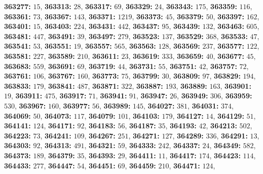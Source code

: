 \textsf{\bfseries 363277:} $15$, \textsf{\bfseries 363313:} $28$, \textsf{\bfseries 363317:} $69$, \textsf{\bfseries 363329:} $24$, \textsf{\bfseries 363343:} $175$, \textsf{\bfseries 363359:} $116$, \textsf{\bfseries 363361:} $73$, \textsf{\bfseries 363367:} $143$, \textsf{\bfseries 363371:} $1219$, \textsf{\bfseries 363373:} $45$, \textsf{\bfseries 363379:} $50$, \textsf{\bfseries 363397:} $162$, \textsf{\bfseries 363401:} $15$, \textsf{\bfseries 363403:} $224$, \textsf{\bfseries 363431:} $442$, \textsf{\bfseries 363437:} $95$, \textsf{\bfseries 363439:} $132$, \textsf{\bfseries 363463:} $605$, \textsf{\bfseries 363481:} $447$, \textsf{\bfseries 363491:} $39$, \textsf{\bfseries 363497:} $279$, \textsf{\bfseries 363523:} $137$, \textsf{\bfseries 363529:} $368$, \textsf{\bfseries 363533:} $47$, \textsf{\bfseries 363541:} $53$, \textsf{\bfseries 363551:} $19$, \textsf{\bfseries 363557:} $565$, \textsf{\bfseries 363563:} $128$, \textsf{\bfseries 363569:} $237$, \textsf{\bfseries 363577:} $122$, \textsf{\bfseries 363581:} $227$, \textsf{\bfseries 363589:} $210$, \textsf{\bfseries 363611:} $23$, \textsf{\bfseries 363619:} $333$, \textsf{\bfseries 363659:} $40$, \textsf{\bfseries 363677:} $45$, \textsf{\bfseries 363683:} $559$, \textsf{\bfseries 363691:} $69$, \textsf{\bfseries 363719:} $44$, \textsf{\bfseries 363731:} $55$, \textsf{\bfseries 363751:} $42$, \textsf{\bfseries 363757:} $72$, \textsf{\bfseries 363761:} $106$, \textsf{\bfseries 363767:} $160$, \textsf{\bfseries 363773:} $75$, \textsf{\bfseries 363799:} $30$, \textsf{\bfseries 363809:} $97$, \textsf{\bfseries 363829:} $194$, \textsf{\bfseries 363833:} $179$, \textsf{\bfseries 363841:} $487$, \textsf{\bfseries 363871:} $322$, \textsf{\bfseries 363887:} $193$, \textsf{\bfseries 363889:} $163$, \textsf{\bfseries 363901:} $19$, \textsf{\bfseries 363911:} $475$, \textsf{\bfseries 363917:} $71$, \textsf{\bfseries 363941:} $91$, \textsf{\bfseries 363947:} $26$, \textsf{\bfseries 363949:} $306$, \textsf{\bfseries 363959:} $530$, \textsf{\bfseries 363967:} $160$, \textsf{\bfseries 363977:} $56$, \textsf{\bfseries 363989:} $145$, \textsf{\bfseries 364027:} $381$, \textsf{\bfseries 364031:} $374$, \textsf{\bfseries 364069:} $50$, \textsf{\bfseries 364073:} $117$, \textsf{\bfseries 364079:} $101$, \textsf{\bfseries 364103:} $179$, \textsf{\bfseries 364127:} $14$, \textsf{\bfseries 364129:} $51$, \textsf{\bfseries 364141:} $124$, \textsf{\bfseries 364171:} $92$, \textsf{\bfseries 364183:} $56$, \textsf{\bfseries 364187:} $35$, \textsf{\bfseries 364193:} $42$, \textsf{\bfseries 364213:} $502$, \textsf{\bfseries 364223:} $73$, \textsf{\bfseries 364241:} $109$, \textsf{\bfseries 364267:} $251$, \textsf{\bfseries 364271:} $127$, \textsf{\bfseries 364289:} $336$, \textsf{\bfseries 364291:} $13$, \textsf{\bfseries 364303:} $92$, \textsf{\bfseries 364313:} $491$, \textsf{\bfseries 364321:} $59$, \textsf{\bfseries 364333:} $242$, \textsf{\bfseries 364337:} $24$, \textsf{\bfseries 364349:} $582$, \textsf{\bfseries 364373:} $189$, \textsf{\bfseries 364379:} $35$, \textsf{\bfseries 364393:} $29$, \textsf{\bfseries 364411:} $11$, \textsf{\bfseries 364417:} $174$, \textsf{\bfseries 364423:} $114$, \textsf{\bfseries 364433:} $277$, \textsf{\bfseries 364447:} $54$, \textsf{\bfseries 364451:} $69$, \textsf{\bfseries 364459:} $210$, \textsf{\bfseries 364471:} $124$, 
